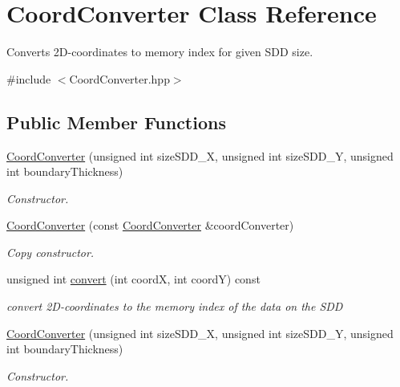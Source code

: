 \hypertarget{classCoordConverter}{}\section{Coord\+Converter Class Reference}
\label{classCoordConverter}


Converts 2\+D-\/coordinates to memory index for given S\+DD size.  




{\ttfamily \#include $<$Coord\+Converter.\+hpp$>$}

\subsection*{Public Member Functions}
\begin{DoxyCompactItemize}
\item 
\hyperlink{classCoordConverter_a0e773a3ee5461119d7ff285fde45427d}{Coord\+Converter} (unsigned int size\+S\+D\+D\+\_\+X, unsigned int size\+S\+D\+D\+\_\+Y, unsigned int boundary\+Thickness)
\begin{DoxyCompactList}\small\item\em Constructor. \end{DoxyCompactList}\item 
\hyperlink{classCoordConverter_af11209a489a46dd335db0635d811999d}{Coord\+Converter} (const \hyperlink{classCoordConverter}{Coord\+Converter} \&coord\+Converter)
\begin{DoxyCompactList}\small\item\em Copy constructor. \end{DoxyCompactList}\item 
\mbox{\label{classCoordConverter_ae62fc899a25ed7b6455927a6ddcccf52}} 
unsigned int \hyperlink{classCoordConverter_ae62fc899a25ed7b6455927a6ddcccf52}{convert} (int coordX, int coordY) const
\begin{DoxyCompactList}\small\item\em convert 2\+D-\/coordinates to the memory index of the data on the S\+DD \end{DoxyCompactList}\item 
\hyperlink{classCoordConverter_a0e773a3ee5461119d7ff285fde45427d}{Coord\+Converter} (unsigned int size\+S\+D\+D\+\_\+X, unsigned int size\+S\+D\+D\+\_\+Y, unsigned int boundary\+Thickness)
\begin{DoxyCompactList}\small\item\em Constructor. \end{DoxyCompactList}\item 

\end{DoxyCompactItemize}
